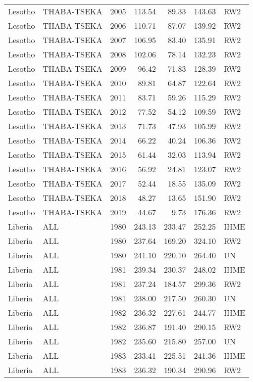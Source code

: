 \begin{longtable}{lllrrrl}
  Lesotho & THABA-TSEKA & 2005 & 113.54 & 89.33 & 143.63 & RW2 \\ 
  Lesotho & THABA-TSEKA & 2006 & 110.71 & 87.07 & 139.92 & RW2 \\ 
  Lesotho & THABA-TSEKA & 2007 & 106.95 & 83.40 & 135.91 & RW2 \\ 
  Lesotho & THABA-TSEKA & 2008 & 102.06 & 78.14 & 132.23 & RW2 \\ 
  Lesotho & THABA-TSEKA & 2009 & 96.42 & 71.83 & 128.39 & RW2 \\ 
  Lesotho & THABA-TSEKA & 2010 & 89.81 & 64.87 & 122.64 & RW2 \\ 
  Lesotho & THABA-TSEKA & 2011 & 83.71 & 59.26 & 115.29 & RW2 \\ 
  Lesotho & THABA-TSEKA & 2012 & 77.52 & 54.12 & 109.59 & RW2 \\ 
  Lesotho & THABA-TSEKA & 2013 & 71.73 & 47.93 & 105.99 & RW2 \\ 
  Lesotho & THABA-TSEKA & 2014 & 66.22 & 40.24 & 106.36 & RW2 \\ 
  Lesotho & THABA-TSEKA & 2015 & 61.44 & 32.03 & 113.94 & RW2 \\ 
  Lesotho & THABA-TSEKA & 2016 & 56.92 & 24.81 & 123.07 & RW2 \\ 
  Lesotho & THABA-TSEKA & 2017 & 52.44 & 18.55 & 135.09 & RW2 \\ 
  Lesotho & THABA-TSEKA & 2018 & 48.27 & 13.65 & 151.90 & RW2 \\ 
  Lesotho & THABA-TSEKA & 2019 & 44.67 & 9.73 & 176.36 & RW2 \\ 
  Liberia & ALL & 1980 & 243.13 & 233.47 & 252.25 & IHME \\ 
  Liberia & ALL & 1980 & 237.64 & 169.20 & 324.10 & RW2 \\ 
  Liberia & ALL & 1980 & 241.10 & 220.10 & 264.40 & UN \\ 
  Liberia & ALL & 1981 & 239.34 & 230.37 & 248.02 & IHME \\ 
  Liberia & ALL & 1981 & 237.24 & 184.57 & 299.36 & RW2 \\ 
  Liberia & ALL & 1981 & 238.00 & 217.50 & 260.30 & UN \\ 
  Liberia & ALL & 1982 & 236.32 & 227.61 & 244.77 & IHME \\ 
  Liberia & ALL & 1982 & 236.87 & 191.40 & 290.15 & RW2 \\ 
  Liberia & ALL & 1982 & 235.60 & 215.80 & 257.00 & UN \\ 
  Liberia & ALL & 1983 & 233.41 & 225.51 & 241.36 & IHME \\ 
  Liberia & ALL & 1983 & 236.32 & 190.34 & 290.96 & RW2 \\ 

\end{longtable}
